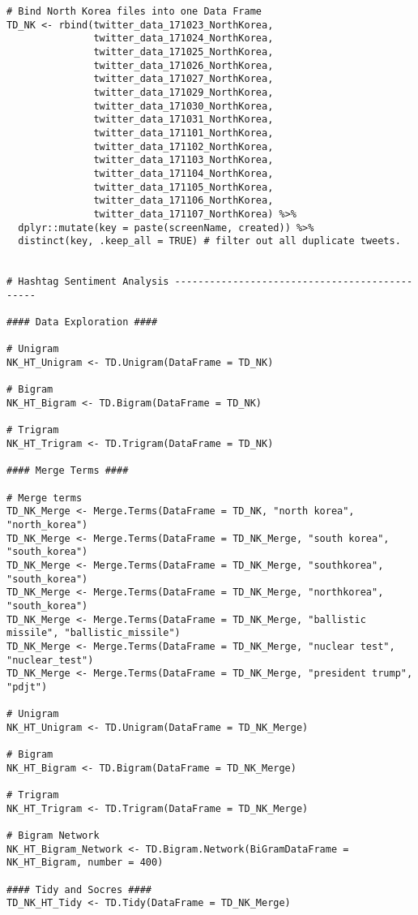 \begin{lstlisting}
# Bind North Korea files into one Data Frame
TD_NK <- rbind(twitter_data_171023_NorthKorea, 
               twitter_data_171024_NorthKorea,
               twitter_data_171025_NorthKorea,
               twitter_data_171026_NorthKorea, 
               twitter_data_171027_NorthKorea,
               twitter_data_171029_NorthKorea, 
               twitter_data_171030_NorthKorea, 
               twitter_data_171031_NorthKorea, 
               twitter_data_171101_NorthKorea, 
               twitter_data_171102_NorthKorea, 
               twitter_data_171103_NorthKorea, 
               twitter_data_171104_NorthKorea, 
               twitter_data_171105_NorthKorea, 
               twitter_data_171106_NorthKorea, 
               twitter_data_171107_NorthKorea) %>% 
  dplyr::mutate(key = paste(screenName, created)) %>% 
  distinct(key, .keep_all = TRUE) # filter out all duplicate tweets.  


# Hashtag Sentiment Analysis ----------------------------------------------

#### Data Exploration ####

# Unigram
NK_HT_Unigram <- TD.Unigram(DataFrame = TD_NK)

# Bigram
NK_HT_Bigram <- TD.Bigram(DataFrame = TD_NK)

# Trigram
NK_HT_Trigram <- TD.Trigram(DataFrame = TD_NK)

#### Merge Terms ####

# Merge terms
TD_NK_Merge <- Merge.Terms(DataFrame = TD_NK, "north korea", "north_korea")
TD_NK_Merge <- Merge.Terms(DataFrame = TD_NK_Merge, "south korea", "south_korea")
TD_NK_Merge <- Merge.Terms(DataFrame = TD_NK_Merge, "southkorea", "south_korea")
TD_NK_Merge <- Merge.Terms(DataFrame = TD_NK_Merge, "northkorea", "south_korea")
TD_NK_Merge <- Merge.Terms(DataFrame = TD_NK_Merge, "ballistic missile", "ballistic_missile")
TD_NK_Merge <- Merge.Terms(DataFrame = TD_NK_Merge, "nuclear test", "nuclear_test")
TD_NK_Merge <- Merge.Terms(DataFrame = TD_NK_Merge, "president trump", "pdjt")

# Unigram
NK_HT_Unigram <- TD.Unigram(DataFrame = TD_NK_Merge)

# Bigram
NK_HT_Bigram <- TD.Bigram(DataFrame = TD_NK_Merge)

# Trigram
NK_HT_Trigram <- TD.Trigram(DataFrame = TD_NK_Merge)

# Bigram Network
NK_HT_Bigram_Network <- TD.Bigram.Network(BiGramDataFrame = NK_HT_Bigram, number = 400)

#### Tidy and Socres #### 
TD_NK_HT_Tidy <- TD.Tidy(DataFrame = TD_NK_Merge)


\end{lstlisting}
